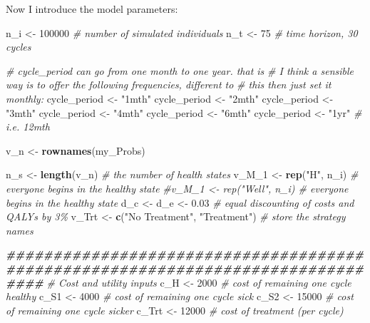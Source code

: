 \documentclass[
]{article}
\newenvironment{Shaded}{\begin{snugshade}}{\end{snugshade}}
\newcommand{\CommentTok}[1]{\textcolor[rgb]{0.56,0.35,0.01}{\textit{#1}}}
\newcommand{\DecValTok}[1]{\textcolor[rgb]{0.00,0.00,0.81}{#1}}
\newcommand{\DocumentationTok}[1]{\textcolor[rgb]{0.56,0.35,0.01}{\textbf{\textit{#1}}}}
\newcommand{\FloatTok}[1]{\textcolor[rgb]{0.00,0.00,0.81}{#1}}
\newcommand{\FunctionTok}[1]{\textcolor[rgb]{0.13,0.29,0.53}{\textbf{#1}}}
\newcommand{\NormalTok}[1]{#1}
\newcommand{\OtherTok}[1]{\textcolor[rgb]{0.56,0.35,0.01}{#1}}
\newcommand{\StringTok}[1]{\textcolor[rgb]{0.31,0.60,0.02}{#1}}
\begin{document}
Now I introduce the model parameters:

\begin{Shaded}
\begin{Highlighting}[]
\NormalTok{n\_i   }\OtherTok{\textless{}{-}} \DecValTok{100000}                 \CommentTok{\# number of simulated individuals}
\NormalTok{n\_t   }\OtherTok{\textless{}{-}} \DecValTok{75}                     \CommentTok{\# time horizon, 30 cycles}

\CommentTok{\# cycle\_period can go from one month to one year. that is}
\CommentTok{\# I think a sensible way is to offer the following frequencies, different to}
\CommentTok{\# this then just set it monthly:}
\NormalTok{cycle\_period }\OtherTok{\textless{}{-}} \StringTok{"1mth"}
\NormalTok{cycle\_period }\OtherTok{\textless{}{-}} \StringTok{"2mth"}
\NormalTok{cycle\_period }\OtherTok{\textless{}{-}} \StringTok{"3mth"}
\NormalTok{cycle\_period }\OtherTok{\textless{}{-}} \StringTok{"4mth"}
\NormalTok{cycle\_period }\OtherTok{\textless{}{-}} \StringTok{"6mth"}
\NormalTok{cycle\_period }\OtherTok{\textless{}{-}} \StringTok{"1yr"} \CommentTok{\# i.e. 12mth}

\NormalTok{v\_n }\OtherTok{\textless{}{-}} \FunctionTok{rownames}\NormalTok{(my\_Probs)}

\NormalTok{n\_s   }\OtherTok{\textless{}{-}} \FunctionTok{length}\NormalTok{(v\_n)                }\CommentTok{\# the number of health states}
\NormalTok{v\_M\_1 }\OtherTok{\textless{}{-}} \FunctionTok{rep}\NormalTok{(}\StringTok{"H"}\NormalTok{, n\_i)              }\CommentTok{\# everyone begins in the healthy state }
\CommentTok{\#v\_M\_1 \textless{}{-} rep("Well", n\_i)              \# everyone begins in the healthy state }
\NormalTok{d\_c   }\OtherTok{\textless{}{-}}\NormalTok{ d\_e }\OtherTok{\textless{}{-}} \FloatTok{0.03}                \CommentTok{\# equal discounting of costs and QALYs by 3\%}
\NormalTok{v\_Trt }\OtherTok{\textless{}{-}}
  \FunctionTok{c}\NormalTok{(}\StringTok{"No Treatment"}\NormalTok{, }\StringTok{"Treatment"}\NormalTok{)    }\CommentTok{\# store the strategy names}

\DocumentationTok{\#\#\#\#\#\#\#\#\#\#\#\#\#\#\#\#\#\#\#\#\#\#\#\#\#\#\#\#\#\#\#\#\#\#\#\#\#\#\#\#\#\#\#\#\#\#\#\#\#\#\#\#\#\#\#\#\#\#\#\#\#\#\#\#\#\#\#\#\#\#\#\#\#\#\#\#\#\#\#\#}
\CommentTok{\# Cost and utility inputs }
\NormalTok{c\_H     }\OtherTok{\textless{}{-}} \DecValTok{2000}                \CommentTok{\# cost of remaining one cycle healthy}
\NormalTok{c\_S1    }\OtherTok{\textless{}{-}} \DecValTok{4000}                \CommentTok{\# cost of remaining one cycle sick }
\NormalTok{c\_S2    }\OtherTok{\textless{}{-}} \DecValTok{15000}               \CommentTok{\# cost of remaining one cycle sicker}
\NormalTok{c\_Trt   }\OtherTok{\textless{}{-}} \DecValTok{12000}               \CommentTok{\# cost of treatment (per cycle)}


\end{Highlighting}
\end{Shaded}
\end{document}
